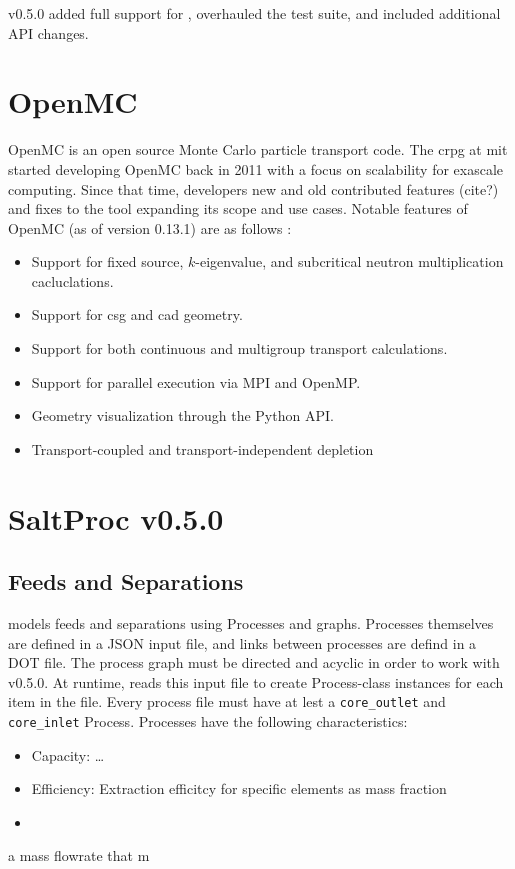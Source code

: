 \SaltProc v0.5.0 added full support for \OpenMC, overhauled the test suite, and included additional API changes.


\section{OpenMC}%
\label{sub:openmc}

OpenMC \cite{romano_jpenmc_2015} is an open source Monte Carlo particle
transport code. The \Gls{crpg} at \Gls{mit} started developing OpenMC back in
2011 with a focus on scalability for exascale computing. Since that time,
developers new and old contributed features (cite?) and fixes to the tool
expanding its scope and use cases. Notable features of OpenMC (as of version
0.13.1) are as follows \cite{homepage_openmc_2022}:
\begin{itemize}
    \item Support for fixed source, $k$-eigenvalue, and subcritical neutron multiplication cacluclations.
    \item Support for \Gls{csg} and \Gls{cad} geometry.
    \item Support for both continuous and multigroup transport calculations.
    \item Support for parallel execution via MPI and OpenMP.
    \item Geometry visualization through the Python API.
    \item Transport-coupled and transport-independent depletion
\end{itemize}

\section{SaltProc v0.5.0}
\label{sec:saltproc-detail}

\subsection{Feeds and Separations}
\SaltProc models feeds and separations using Processes and graphs. Processes themselves are
defined in a JSON input file, and links between processes are defind in a DOT
file. The process graph must be directed and acyclic in order to work with
\SaltProc v0.5.0. At runtime, \SaltProc reads this input file to create
Process-class instances for each item in the file. Every process file must have
at lest a \verb.core_outlet. and \verb.core_inlet. Process. Processes have the following characteristics:
\begin{itemize}
    \item Capacity: \ldots
    \item Efficiency: Extraction efficitcy for specific elements as mass fraction
    \item 
\end{itemize}a mass flowrate that m

